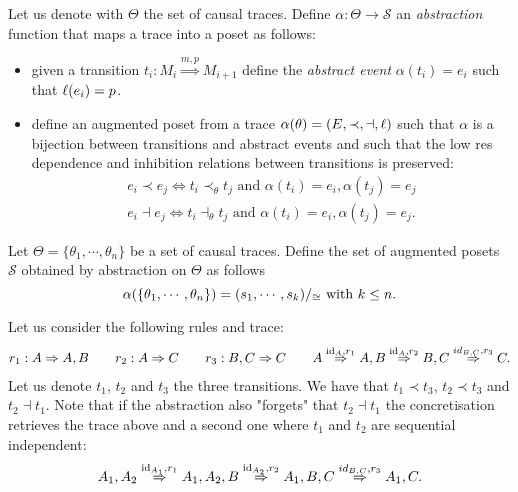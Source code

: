 \begin{definition}
  \label{def:abstraction}
  Let us denote with $\Theta$ the set of causal traces.
  Define $\alpha:\Theta\to\mathcal{S}$ an \emph{abstraction} function that maps a trace into a poset as follows:
  \begin{itemize}
  \item given a transition $t_i:M_i\overset{m,p}{\Rightarrow} M_{i+1}$ define the \emph{abstract event} $\alpha(t_i) = e_i$ such that $\ell(e_i) = p$.
  \item define an augmented poset from a trace $\alpha(\theta) = (E,\prec,\dashv,\ell)$ such that $\alpha$ is a bijection between transitions and abstract events and such that the low res dependence and inhibition relations between transitions is preserved:
    \begin{align*}
      e_i \prec e_j \iff t_i \prec_{\theta} t_j \text{ and } \alpha(t_i)=e_i, \alpha(t_j)=e_j\\
      e_i \dashv e_j \iff t_i \dashv_{\theta} t_j \text{ and } \alpha(t_i)=e_i, \alpha(t_j)=e_j.
    \end{align*}
  \end{itemize}
  Let $\Theta = \{\theta_1,\cdots,\theta_n\}$ be a set of causal traces.
  Define the set of augmented posets $\mathcal{S}$ obtained by abstraction on $\Theta$ as follows
  \[
  \alpha(\{\theta_1,\cdots,\theta_n\}) = (s_1,\cdots, s_k)/_{\cong}\text{ with }k\leq n.
  \]
\end{definition}

\begin{example}
  Let us consider the following rules and trace:
  \begin{align*}
    r_1:A \Rightarrow A, B\qquad r_2:A \Rightarrow C \qquad r_3: B,C \Rightarrow C\qquad
    A \overset{\text{id}_A,r_1}{\Rightarrow} A, B \overset{\text{id}_A,r_2}{\Rightarrow} B,C \overset{id_{B,C},r_3}{\Rightarrow}C.
  \end{align*}
  Let us denote $t_1$, $t_2$ and $t_3$ the three transitions. We have that $t_1\prec t_3$, $t_2\prec t_3$ and $t_2\dashv t_1$.
  Note that if the abstraction also "forgets" that $t_2\dashv t_1$ the concretisation retrieves the trace above and a second one where $t_1$ and $t_2$ are sequential independent:
  \begin{align*}
    A_1,A_2 \overset{\text{id}_{A_1},r_1}{\Rightarrow} A_1,A_2,B \overset{\text{id}_{A_2},r_2}{\Rightarrow} A_1,B,C \overset{id_{B,C},r_3}{\Rightarrow} A_1,C.
  \end{align*}
\end{example}

